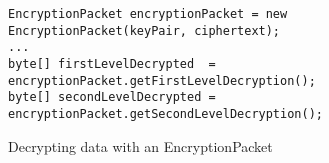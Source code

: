 \begin{figure}[H]
  \centering
  \begin{verbatim}
EncryptionPacket encryptionPacket = new EncryptionPacket(keyPair, ciphertext);
...
byte[] firstLevelDecrypted  = encryptionPacket.getFirstLevelDecryption();
byte[] secondLevelDecrypted = encryptionPacket.getSecondLevelDecryption();
  \end{verbatim}
  \caption{Decrypting data with an EncryptionPacket}
  \label{code:encryption_packet_decryption}
\end{figure}
